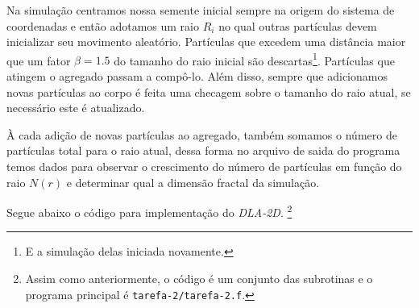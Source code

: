 \documentclass[a4paper, 11pt]{tufte-handout}
\begin{document}
Na simulação centramos nossa semente inicial sempre na origem do sistema de coordenadas e
então adotamos um raio \( R_i \) no qual outras partículas devem inicializar seu movimento
aleatório. Partículas que excedem uma distância maior que um fator \( \beta = 1.5 \) do tamanho do raio
inicial são descartas\footnote{E a simulação delas iniciada novamente.}. Partículas que atingem o
agregado passam a compô-lo. Além disso, sempre que adicionamos novas partículas ao corpo é feita uma
checagem sobre o tamanho do raio atual, se necessário este é atualizado.

À cada adição de novas partículas ao agregado, também somamos o número de partículas total para o
raio atual, dessa forma no arquivo de saida do programa temos dados para observar o crescimento
do número de partículas em função do raio $N(r)$ e determinar qual a dimensão fractal da simulação.


Segue abaixo o código para implementação do \emph{DLA-2D}. \footnote{Assim como anteriormente, o código é um
conjunto das subrotinas e o programa principal é \verb|tarefa-2/tarefa-2.f|.}
\end{document}
